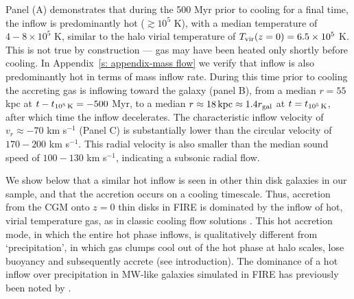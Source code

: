 \documentclass[fleqn,usenatbib]{mnras}
\newcommand{\tcools}{t_{10^5\,{\rm K}}}
\newcommand{\Tvir}{T_{\rm vir}}
\begin{document}
Panel (A) demonstrates that during the 500 Myr prior to cooling for a final time, the inflow is predominantly hot ($\gtrsim 10^5$ K), with a median temperature of $4-8\times10^5$ K, similar to the halo virial temperature of $\Tvir(z=0)=6.5\times10^5$ K.
This is not true by construction --- gas may have been heated only shortly before cooling.
In Appendix~\ref{s: appendix-mass flow} we verify that inflow is also predominantly hot in terms of mass inflow rate.
During this time prior to cooling the accreting gas is inflowing toward the galaxy (panel B), from a median $r=55$ kpc at $t-\tcools=-500$ Myr, to a median $r\approx18\,{\rm kpc}\approx1.4 r_{\rm gal}$ at $t=\tcools$, after which time the inflow decelerates.
The characteristic inflow velocity of $v_r \approx-70$ km s$^{-1}$ (Panel C) is substantially lower than the circular velocity of $170-200$ km s$^{-1}$.
This radial velocity is also smaller than the median sound speed of $100-130$ km s$^{-1}$, indicating a subsonic radial flow. 

We show below that a similar hot inflow is seen in other thin disk galaxies in our sample, and that the accretion occurs on a cooling timescale. 
Thus, accretion from the CGM onto $z=0$ thin disks in FIRE is dominated by the inflow of hot, virial temperature gas, as in classic cooling flow solutions \citep[e.g.][]{Fabian1984}.
This hot accretion mode, in which the entire hot phase inflows, is qualitatively different from `precipitation', in which gas clumps cool out of the hot phase at halo scales, lose buoyancy and subsequently accrete (see introduction). 
The dominance of a hot inflow over precipitation in MW-like galaxies simulated in FIRE has previously been noted by \cite{Esmerian2021}. 
\end{document}
